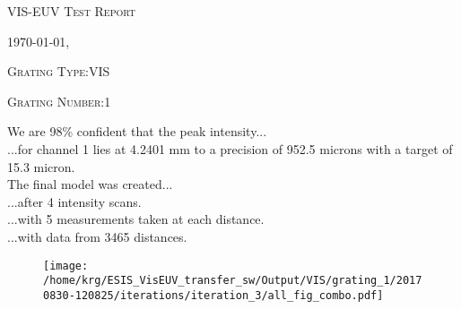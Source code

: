 \documentclass[12pt,a4paper]{article}
\begin{document}
\begin{center}
{\scshape\LARGE VIS-EUV Test Report \par}
{\scshape\Large \today, \currenttime \par}
\bigskip
{\scshape\large Grating Type:VIS \par}
{\scshape\large Grating Number:1 \par}
\end{center}
\noindent We are 98\% confident that the peak intensity...\\
\indent...for channel 1 lies at 4.2401 mm to a precision of 952.5 microns with a target of 15.3 micron.\\
\noindent The final model was created...\\
\indent...after 4 intensity scans.\\
\indent...with 5 measurements taken at each distance.\\
\indent...with data from 3465 distances.\\
\begin{figure}[H]
\centering
\texttt{[image: /home/krg/ESIS\_VisEUV\_transfer\_sw/Output/VIS/grating\_1/20170830-120825/iterations/iteration\_3/all\_fig\_combo.pdf]}\\
\end{figure}
\end{document}
